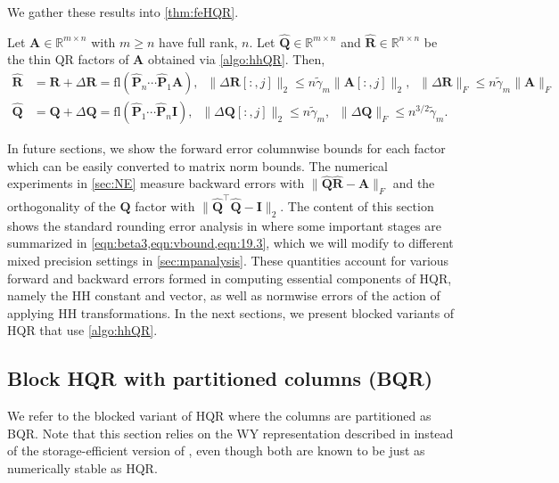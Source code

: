 \documentclass[review,onefignum,onetabnum]{siamart190516}
\newcommand{\R}{\mathbb{R}}
\newcommand{\bb}[1]{\mathbf{#1}}
\newcommand{\fl}{\mathrm{fl}}
\begin{document}
We gather these results into \cref{thm:feHQR}.
\begin{theorem}
	\label{thm:feHQR}
	Let $\bb{A}\in\R^{m\times n}$ with $m\geq n$ have full rank, $n$. 
	Let $\hat{\bb{Q}}\in\R^{m\times n}$ and $\hat{\bb{R}}\in\R^{n\times n}$ be the thin QR factors of $\bb{A}$ obtained via \cref{algo:hhQR}.
	Then,
	\begin{align*}
	\hat{\bb{R}} &= \bb{R} + \Delta \bb{R} = \fl(\hat{\bb{P}}_n\cdots\hat{\bb{P}}_1 \bb{A}),\;\; \|\Delta \bb{R}[:,j]\|_2\leq n\tilde{\gamma}_{m} \|\bb{A}[:,j]\|_2,\;\; \|\Delta \bb{R}\|_F\leq n\tilde{\gamma}_{m} \|\bb{A}\|_F\\
	\hat{\bb{Q}} &= \bb{Q} + \Delta \bb{Q} = \fl(\hat{\bb{P}}_1\cdots\hat{\bb{P}}_n \bb{I}),\;\; \|\Delta \bb{Q}[:,j]\|_2\leq n\tilde{\gamma}_{m},\;\; \|\Delta \bb{Q}\|_F \leq n^{3/2} \tilde{\gamma}_{m}.
	\end{align*}
\end{theorem}
In future sections, we show the forward error columnwise bounds for each factor which can be easily converted to matrix norm bounds.
The numerical experiments in \cref{sec:NE} measure backward errors with $\|\hat{\bb{Q}}\hat{\bb{R}}-\bb{A}\|_F$ and the orthogonality of the $\bb{Q}$ factor with $\|\hat{\bb{Q}}^{\top}\hat{\bb{Q}}-\bb{I}\|_2$.
The content of this section shows the standard rounding error analysis in \cite{Higham2002} where some important stages are summarized in \cref{eqn:beta3,eqn:vbound,eqn:19.3}, which we will modify to different mixed precision settings in \cref{sec:mpanalysis}. 
These quantities account for various forward and backward errors formed in computing essential components of HQR, namely the HH constant and vector, as well as normwise errors of the action of applying HH transformations.
In the next sections, we present blocked variants of HQR that use \cref{algo:hhQR}.
%
\subsection{Block HQR with partitioned columns (BQR)}\label{sec:BQR}
We refer to the blocked variant of HQR where the columns are partitioned as BQR. 
Note that this section relies on the WY representation described in \cite{Bischof1987} instead of the storage-efficient version of \cite{Schreiber1989}, even though both are known to be just as numerically stable as HQR.
\end{document}
